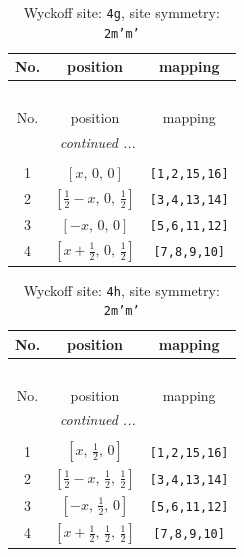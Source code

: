 \documentclass[fleqn,8pt]{jsarticle}
\begin{document}
\renewcommand{\arraystretch}{1.2}
\begin{longtable}{ccc}
\caption{Wyckoff site: {\tt 4g}, site symmetry: {\tt 2m'm'}}
 \\
 \hline \hline
No. & position & mapping \\ \hline \endfirsthead

\multicolumn{2}{l}{\tablename\ \thetable{}} \\
 \hline \hline
No. & position & mapping \\ \hline \endhead

 \hline \hline
\multicolumn{2}{r}{\footnotesize\it continued ...} \\ \endfoot

 \hline \hline
\multicolumn{2}{r}{} \\ \endlastfoot

1 & $\left[ x,\, 0,\, 0 \right]$ & {\tt [1,2,15,16]} \\ \hline
2 & $\left[ \frac{1}{2} - x,\, 0,\, \frac{1}{2} \right]$ & {\tt [3,4,13,14]} \\ \hline
3 & $\left[ - x,\, 0,\, 0 \right]$ & {\tt [5,6,11,12]} \\ \hline
4 & $\left[ x + \frac{1}{2},\, 0,\, \frac{1}{2} \right]$ & {\tt [7,8,9,10]} \\
\end{longtable}
\renewcommand{\arraystretch}{1.2}
\begin{longtable}{ccc}
\caption{Wyckoff site: {\tt 4h}, site symmetry: {\tt 2m'm'}}
 \\
 \hline \hline
No. & position & mapping \\ \hline \endfirsthead

\multicolumn{2}{l}{\tablename\ \thetable{}} \\
 \hline \hline
No. & position & mapping \\ \hline \endhead

 \hline \hline
\multicolumn{2}{r}{\footnotesize\it continued ...} \\ \endfoot

 \hline \hline
\multicolumn{2}{r}{} \\ \endlastfoot

1 & $\left[ x,\, \frac{1}{2},\, 0 \right]$ & {\tt [1,2,15,16]} \\ \hline
2 & $\left[ \frac{1}{2} - x,\, \frac{1}{2},\, \frac{1}{2} \right]$ & {\tt [3,4,13,14]} \\ \hline
3 & $\left[ - x,\, \frac{1}{2},\, 0 \right]$ & {\tt [5,6,11,12]} \\ \hline
4 & $\left[ x + \frac{1}{2},\, \frac{1}{2},\, \frac{1}{2} \right]$ & {\tt [7,8,9,10]} \\
\end{longtable}
\end{document}
